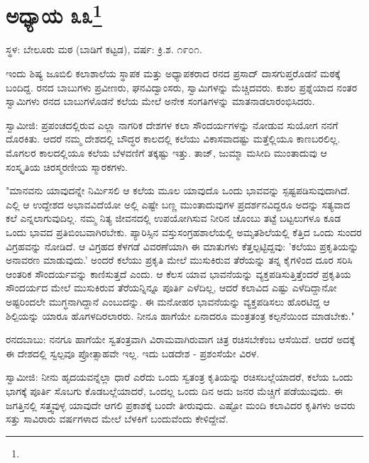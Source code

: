 \newpage

\chapter[ಅಧ್ಯಾಯ ೩೩]{ಅಧ್ಯಾಯ ೩೩\protect\footnote{}}

\begin{center}
ಸ್ಥಳ: ಬೇಲೂರು ಮಠ (ಬಾಡಿಗೆ ಕಟ್ಟಡ), ವರ್ಷ: ಕ್ರಿ.ಶ. ೧೯೦೧.
\end{center}

ಇಂದು ಶಿಷ್ಯ ಜೂಬಿಲಿ ಕಲಾಶಾಲೆಯ ಸ್ಥಾಪಕ ಮತ್ತು ಅಧ್ಯಾಪಕರಾದ ರನದ ಪ್ರಸಾದ್ ದಾಸಗುಪ್ತರೊಡನೆ ಮಠಕ್ಕೆ ಬಂದಿದ್ದ. ರನದ ಬಾಬುಗಳು ಪ್ರವೀಣರು, ಘನವಿದ್ವಾಂಸರು, ಸ್ವಾಮಿಗಳನ್ನು ಮೆಚ್ಚಿದವರು. ಕುಶಲ ಪ್ರಶ್ನೆಯಾದ ನಂತರ ಸ್ವಾಮಿಗಳು ರನದ ಬಾಬುಗಳೊಡನೆ ಕಲೆಯ ಮೇಲೆ ಅನೇಕ ಸಂಗತಿಗಳನ್ನು ಮಾತನಾಡಲಾರಂಭಿಸಿದರು.

ಸ್ವಾಮೀಜಿ: ಪ್ರಪಂಚದಲ್ಲಿರುವ ಎಲ್ಲಾ ನಾಗರಿಕ ದೇಶಗಳ ಕಲಾ ಸೌಂದರ್ಯಗಳನ್ನು ನೋಡುವ ಸುಯೋಗ ನನಗೆ ದೊರಕಿತು. ಆದರೆ ನಮ್ಮ ದೇಶದಲ್ಲಿ ಬೌದ್ಧರ ಕಾಲದಲ್ಲಿ ಕಲೆಯು ವಿಕಾಸವಾದಷ್ಟು ಮತ್ತೆಲ್ಲಿಯೂ ಕಾಣಬರಲಿಲ್ಲ. ಮೊಗಲರ ಕಾಲದಲ್ಲಿಯೂ ಕಲೆಯ ಬೆಳವಣಿಗೆ ತಕ್ಕಷ್ಟು ಇತ್ತು. ತಾಜ್, ಜುಮ್ಮಾ ಮಸೀದಿ ಮುಂತಾದುವು ಆ ಸಂಸ್ಕೃತಿಯ ಚಿರಸ್ಮರಣೀಯ ಸ್ಮಾರಕಗಳು.

"ಮಾನವನು ಯಾವುದನ್ನೇ ನಿರ್ಮಿಸಲಿ ಆ ಕಲೆಯ ಮೂಲ ಯಾವುದೊ ಒಂದು ಭಾವವನ್ನು ಸ್ಪಷ್ಟಪಡಿಸುವುದಾಗಿದೆ. ಎಲ್ಲಿ ಆ ಉದ್ದೇಶದ ಅಭಾವವಿದೆಯೋ ಅಲ್ಲಿ ಎಷ್ಟೇ ಬಣ್ಣ ಮುಂತಾದುವುಗಳ ಪ್ರದರ್ಶನವಿದ್ದರೂ ಅದನ್ನು ಸತ್ಯವಾದ ಕಲೆ ಎನ್ನಲಾಗುವುದಿಲ್ಲ. ನಮ್ಮ ನಿತ್ಯ ಜೀವನದಲ್ಲಿ ಉಪಯೋಗಿಸುವ ನೀರಿನ ಚೊಂಬು ತಟ್ಟೆ ಬಟ್ಟಲುಗಳೂ ಕೂಡ ಒಂದು ಭಾವದ ಪ್ರತಿಬಿಂಬವಾಗಿರಬೇಕು. ಪ್ಯಾರಿಸ್ಸಿನ ವಸ್ತುಸಂಗ್ರಹಶಾಲೆಯಲ್ಲಿ ಅಮೃತಶಿಲೆಯಲ್ಲಿ ಕೆತ್ತಿದ ಒಂದು ಸುಂದರ ವಿಗ್ರಹವನ್ನು ನೋಡಿದೆ. ಆ ವಿಗ್ರಹದ ಕೆಳಗಡೆ ವಿವರಣೆಯಾಗಿ ಈ ಮಾತುಗಳು ಕೆತ್ತಲ್ಪಟ್ಟಿದ್ದವು: 'ಕಲೆಯು ಪ್ರಕೃತಿಯನ್ನು ಅನಾವರಣ ಮಾಡುವುದು.' ಅಂದರೆ ಕಲೆಯು ಪ್ರಕೃತಿ ಮೇಲೆ ಮುಸುಕಿರುವ ತೆರೆಯನ್ನು ತನ್ನ ಕೈಗಳಿಂದ ದೂರ ಸರಿಸಿ ಆಂತರಿಕ ಸೌಂದರ್ಯವನ್ನು ಕಾಣಿಸುತ್ತದೆ ಎಂದು. ಆ ಕೆಲಸ ಯಾವ ಭಾವನೆಯನ್ನು ವ್ಯಕ್ತಪಡಿಸುತ್ತಿತ್ತೆಂದರೆ ಪ್ರಕೃತಿಯ ಸೌಂದರ್ಯದ ಮೇಲೆ ಮುಸುಕಿರುವ ತೆರೆಯನ್ನಿನ್ನೂ ಪೂರ್ತಿ ಎಳೆದಿಲ್ಲ, ಆದರೆ ಕಲಾವಿದ ಎಷ್ಟು ಎಳೆದಿದ್ದಾನೋ ಅಷ್ಟರಿಂದಲೇ ಮುಗ್ಧನಾಗಿದ್ದಾನೆ ಎಂಬುದನ್ನು. ಈ ಮನೋಹರ ಭಾವನೆಯನ್ನು ವ್ಯಕ್ತಪಡಿಸಲು ಹೊರಟಿದ್ದ ಆ ಶಿಲ್ಪಿಯನ್ನು ಯಾರೂ ಹೊಗಳದಿರಲಾರರು. ನೀನೂ ಹಾಗೆಯೇ ಏನಾದರೂ ಮಂತ್ರತಂತ್ರ ಕಲ್ಪನೆಯಿಂದ ಮಾಡಬೇಕು."

ರನದಬಾಬು: ನನಗೂ ಹಾಗೆಯೇ ಸ್ವತಂತ್ರವಾಗಿ ವಿರಾಮವಾಗಿರುವಾಗ ಚಿತ್ರ ರಚಿಸಬೇಕೆಂಬ ಆಸೆಯಿದೆ. ಆದರೆ ಅದಕ್ಕೆ ಈ ದೇಶದಲ್ಲಿ ಸ್ವಲ್ಪವೂ ಪ್ರೋತ್ಸಾಹವೇ ಇಲ್ಲ. ಇದು ಬಡದೇಶ - ಪ್ರಶಂಸೆಯೇ ವಿರಳ.

ಸ್ವಾಮೀಜಿ: ನೀನು ಹೃದಯವನ್ನೆಲ್ಲಾ ಧಾರೆ ಎರೆದು ಒಂದು ಸ್ವತಂತ್ರ ಕೃತಿಯನ್ನು ರಚಿಸಬಲ್ಲೆಯಾದರೆ, ಕಲೆಯ ಒಂದು ಭಾಗಕ್ಕೆ ಪೂರ್ತಿ ಸೊಬಗು ಕೊಡಬಲ್ಲೆಯಾದರೆ, ಒಂದಲ್ಲ ಒಂದು ದಿನ ಅದು ಜನರ ಮೆಚ್ಚಿಗೆ ಪಡೆಯುವುದು. ಈ ಜಗತ್ತಿನಲ್ಲಿ ಸತ್ತ್ವವುಳ್ಳ ಯಾವುದೇ ಆಗಲಿ ಪ್ರಕಾಶಕ್ಕೆ ಬಂದೇ ತೀರುವುದು. ಎಷ್ಟೋ ಮಂದಿ ಕಲಾವಿದರ ಕೃತಿಗಳು ಅವರು ಸತ್ತು ಸಾವಿರಾರು ವರ್ಷಗಳಾದ ಮೇಲೆ ಬೆಳಕಿಗೆ ಬಂದುವೆಂದು ಕೇಳಿದ್ದೇವೆ.

